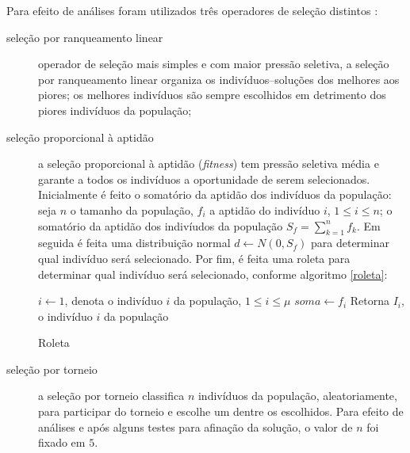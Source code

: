 \documentclass[relatorio,nocolorlinks]{inf-ufg}
\begin{document}
Para efeito de an\'{a}lises foram utilizados tr\^{e}s operadores de sele\c{c}\~{a}o distintos \cite{DeJong2006} \cite{Engelbrecht2007}:
\begin{description}
\item[sele\c{c}\~{a}o por ranqueamento linear] operador de sele\c{c}\~{a}o mais simples e com maior press\~{a}o seletiva, a sele\c{c}\~{a}o
por ranqueamento linear organiza os indiv\'{i}duos--solu\c{c}\~{o}es dos melhores aos piores; os melhores indiv\'{i}duos s\~{a}o sempre
escolhidos em detrimento dos piores indiv\'{i}duos da popula\c{c}\~{a}o;
\item[sele\c{c}\~{a}o proporcional \`{a} aptid\~{a}o] a sele\c{c}\~{a}o proporcional \`{a} aptid\~{a}o (\textit{fitness}) tem press\~{a}o
seletiva m\'{e}dia e garante a todos os indiv\'{i}duos a oportunidade de serem selecionados. Inicialmente \'{e} feito o somat\'{o}rio da
aptid\~{a}o dos indiv\'{i}duos da popula\c{c}\~{a}o: seja $n$ o tamanho da popula\c{c}\~{a}o, $f_{i}$ a aptid\~{a}o do indiv\'{i}duo
$i$, $1 \leq i \leq n$; o somat\'{o}rio da aptid\~{a}o dos indiv\'{i}udos da popula\c{c}\~{a}o $S_{f} = \sum^{n}_{k=1}f_{k}$. Em seguida
\'{e} feita uma distribui\c{c}\~{a}o normal $d \leftarrow N(0, S_{f})$ para determinar qual indiv\'{i}duo ser\'{a} selecionado. Por fim,
\'{e} feita uma roleta para determinar qual indiv\'{i}duo ser\'{a} selecionado, conforme algoritmo \ref{roleta}:


\medskip
\begin{center}
\begin{minipage}{0.92\textwidth}
\begin{algorithm2e}[H]
  \dontprintsemicolon
  \linesnumbered
  \SetLine
  \BlankLine
  \BlankLine
  $i \leftarrow 1$, denota o indiv\'{i}duo $i$ da popula\c{c}\~{a}o, $1 \leq i \leq \mu$\;
  $soma \leftarrow f_{i}$\;
  Retorna $I_{i}$, o indiv\'{i}duo $i$ da popula\c{c}\~{a}o\;
\caption{Roleta}
\label{roleta}
\end{algorithm2e}
\end{minipage}
\end{center}

\item[sele\c{c}\~{a}o por torneio] a sele\c{c}\~{a}o por torneio classifica $n$ indiv\'{i}duos da popula\c{c}\~{a}o,
aleatoriamente, para participar do torneio e escolhe um dentre os escolhidos. Para efeito de an\'{a}lises e ap\'{o}s alguns testes para
afina\c{c}\~{a}o da solu\c{c}\~{a}o, o valor de $n$ foi fixado em $5$.
\end{description}
\end{document}
